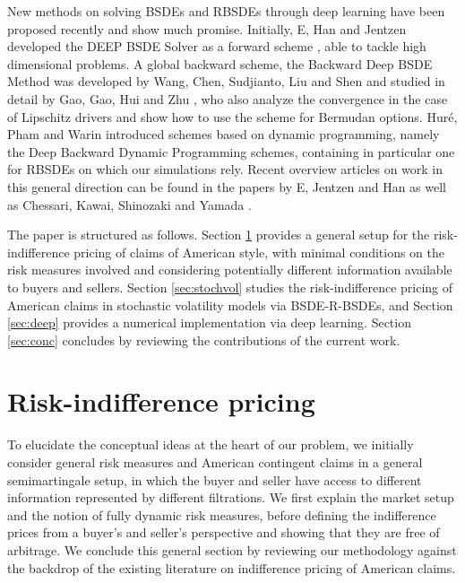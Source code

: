\documentclass{article}
\begin{document}
New methods on solving BSDEs and RBSDEs through deep learning have been proposed recently and show much promise. Initially, E, Han and Jentzen developed the DEEP BSDE Solver as a forward scheme \cite{EHJ17, EHJ18}, able to tackle high dimensional problems. A global backward scheme, the Backward Deep BSDE Method was developed by Wang, Chen, Sudjianto, Liu and Shen \cite{WCSLS18} and studied in detail by Gao, Gao, Hui and Zhu \cite{GGHZ23}, who also analyze the convergence in the case of Lipschitz drivers and show how to use the scheme for Bermudan options. Hur\'{e}, Pham and Warin \cite{HPW20} introduced schemes based on dynamic programming, namely the Deep Backward Dynamic Programming schemes, containing in particular one for RBSDEs on which our simulations rely. Recent overview articles on work in this general direction can be found in the papers by E, Jentzen and Han \cite{EJH22} as well as Chessari, Kawai, Shinozaki and Yamada \cite{CKSY23}.

The paper is structured as follows. Section \ref{sec:pricing} provides a general setup for the risk-indifference pricing of claims of American style, with minimal conditions on the risk measures involved and considering potentially different information available to buyers and sellers. Section \ref{sec:stochvol} studies the risk-indifference pricing of American claims in stochastic volatility models via BSDE-R-BSDEs, and Section \ref{sec:deep} provides a numerical implementation via deep learning. Section \ref{sec:conc} concludes by reviewing the contributions of the current work.





\section{Risk-indifference pricing}\label{sec:pricing}

To elucidate the conceptual ideas at the heart of our problem, we initially consider general risk measures and American contingent claims in a general semimartingale setup, in which the buyer and seller have access to different information represented by different filtrations. We first explain the market setup and the notion of fully dynamic risk measures, before defining the indifference prices from a buyer's and seller's perspective and showing that they are free of arbitrage. We conclude this general section by reviewing our methodology against the backdrop of the existing literature on indifference pricing of American claims.
\end{document}
